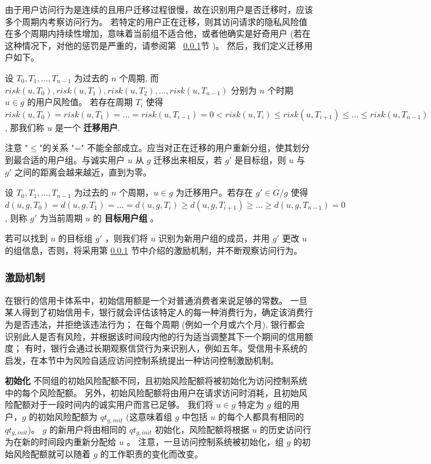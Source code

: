 由于用户访问行为是连续的且用户迁移过程很慢，故在识别用户是否迁移时，应该多个周期内考察访问行为。 若特定的用户正在迁移，则其访问请求的隐私风险值在多个周期内持续性增加，意味着当前组不适合他，或者他确实是好奇用户 (若在这种情况下，对他的惩罚是严重的，请参阅第 ~\ref{subsec:Incentive mechanism}节 )。 然后，我们定义迁移用户如下。

\begin{definition}%
	\label{def:migrating user}
	设 $T_0,T_1,...,T_{n-1}$ 为过去的 $n$ 个周期, 而 $risk(u,T_0),risk(u,T_1),risk(u,T_2),..., risk(u,T_{n-1})$ 分别为 $n$ 个时期 $u\in g$ 的用户风险值。 若存在周期 $T_i$ 使得 $risk(u,T_0) = risk(u,T_1) = ... = risk(u,T_{i-1}) =0  < risk(u,T_{i}) \leq risk(u,T_{i+1}) \leq ... \leq risk(u,T_{n-1})$, 那我们称 $u$ 是一个 \textbf{迁移用户}.
\end{definition}

注意 "$\leq$"的关系 "=" 不能全部成立。应当对正在迁移的用户重新分组，使其划分到最合适的用户组。与诚实用户 $u$ 从 $g$ 迁移出来相反，若 $g'$ 是目标组，则 $u$ 与 $g'$ 之间的距离会越来越近，直到为零。

\begin{definition}%
	\label{def:target group}
	设 $T_0,T_1,...,T_{n-1}$ 为过去的 $n$ 个周期，$u \in g$ 为迁移用户。若存在 $g' \in G/g$ 使得 $d(u,g,T_0) = d(u,g,T_1) = ... = d(u,g,T_i) \geq d(u,g,T_{i+1}) \geq ... \geq d(u,g,T_{n-1}) = 0$, 则称 $g'$ 为当前周期 $u$ 的 \textbf{目标用户组} 。 
\end{definition}

若可以找到 $u$ 的目标组 $g'$ ，则我们将 $u$ 识别为新用户组的成员，并用 $g'$ 更改 $u$ 的组信息，否则，将采用第 \ref{subsec:Incentive mechanism} 节中介绍的激励机制，并不断观察访问行为。

\subsubsection{激励机制}
\label{subsec:Incentive mechanism}

在银行的信用卡体系中，初始信用额是一个对普通消费者来说足够的常数。 一旦某人得到了初始信用卡，银行就会评估该特定人的每一种消费行为，确定该消费行为是否违法，并拒绝该违法行为； 在每个周期 (例如一个月或六个月), 银行都会识别此人是否有风险，并根据该时间段内他的行为适当调整其下一个期间的信用额度； 有时，银行会通过长期观察信贷行为来识别人，例如五年。受信用卡系统的启发，在本节中为风险自适应访问控制系统提出一种访问控制激励机制。

\textbf{初始化} 不同组的初始风险配额不同，且初始风险配额将被初始化为访问控制系统中的每个风险配额。 另外，初始风险配额将由用户在请求访问时消耗，且初始风险配额对于一段时间内的诚实用户而言已足够。 我们将 $u \in g$ 特定为 $g$ 组的用户，$g$ 的初始风险配额为 $qt_{g,init}$ (这意味着组 $g$ 中包括 $u$ 的每个人都具有相同的 $qt_{g,init}$)。 $g$ 的新用户将由相同的 $qt_{g,init}$ 初始化，风险配额将根据 $u$ 的历史访问行为在新的时间段内重新分配给 $u$ 。 注意，一旦访问控制系统被初始化，组 $g$ 的初始风险配额就可以随着 $g$ 的工作职责的变化而改变。

